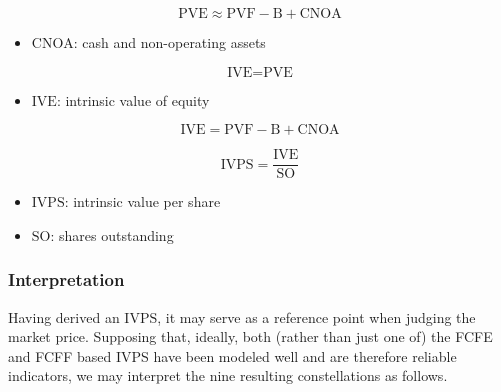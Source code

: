 $$
\text{PVE} \approx \text{PVF} - \text{B} + \text{CNOA}
$$

\begin{itemize}
  \item[] $\text{CNOA}$: cash and non-operating assets
\end{itemize}

$$
\text{IVE} = \text{PVE}
$$

\begin{itemize}
  \item[] $\text{IVE}$: intrinsic value of equity
\end{itemize}

$$
\text{IVE} = \text{PVF} - \text{B} + \text{CNOA}
$$

$$
\text{IVPS} = \frac{\text{IVE}}{\text{SO}}
$$

\begin{itemize}
  \item[] $\text{IVPS}$: intrinsic value per share
  \item[] $\text{SO}$: shares outstanding
\end{itemize}

\subsubsection{Interpretation}

Having derived an $\text{IVPS}$, it may serve as a reference point when judging the market price. Supposing that, ideally, both (rather than just one of) the FCFE and FCFF based IVPS have been modeled well and are therefore reliable indicators, we may interpret the nine resulting constellations as follows.

\renewcommand{\arraystretch}{1.8}

